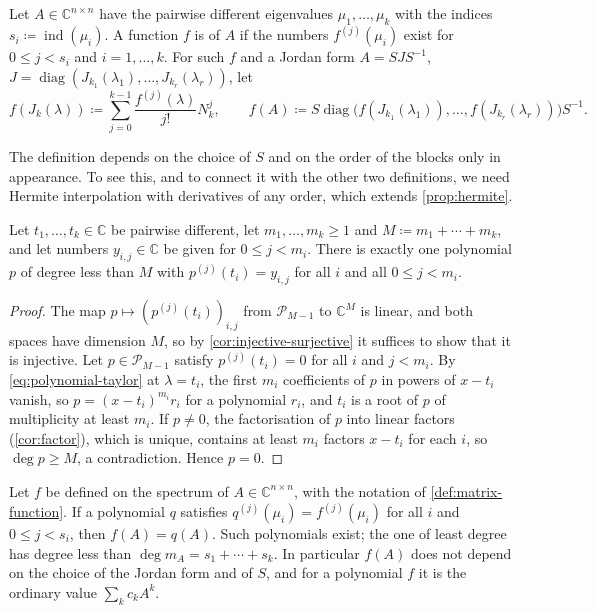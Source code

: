 \begin{definition}
\label{def:matrix-function}
Let $A\in\mathbb C^{n\times n}$ have the pairwise different eigenvalues $\mu_1,\ldots,\mu_k$ with the indices $s_i\coloneqq\operatorname{ind}(\mu_i)$. A function $f$ is  of $A$ if the numbers $f^{(j)}(\mu_i)$ exist for $0\le j<s_i$ and $i=1,\ldots,k$. For such $f$ and a Jordan form $A=SJS^{-1}$, $J=\operatorname{diag}(J_{k_1}(\lambda_1),\ldots,J_{k_r}(\lambda_r))$, let
\[
f(J_k(\lambda))\coloneqq\sum_{j=0}^{k-1}\frac{f^{(j)}(\lambda)}{j!}N_k^j,\qquad f(A)\coloneqq S\operatorname{diag}\bigl(f(J_{k_1}(\lambda_1)),\ldots,f(J_{k_r}(\lambda_r))\bigr)S^{-1}.
\]
\end{definition}

The definition depends on the choice of $S$ and on the order of the blocks only in appearance. To see this, and to connect it with the other two definitions, we need Hermite interpolation with derivatives of any order, which extends \cref{prop:hermite}.

\begin{proposition}
\label{prop:hermite-general}
Let $t_1,\ldots,t_k\in\mathbb C$ be pairwise different, let $m_1,\ldots,m_k\ge1$ and $M\coloneqq m_1+\cdots+m_k$, and let numbers $y_{i,j}\in\mathbb C$ be given for $0\le j<m_i$. There is exactly one polynomial $p$ of degree less than $M$ with $p^{(j)}(t_i)=y_{i,j}$ for all $i$ and all $0\le j<m_i$.
\end{proposition}

\begin{proof}
The map $p\mapsto(p^{(j)}(t_i))_{i,j}$ from $\mathcal P_{M-1}$ to $\mathbb C^M$ is linear, and both spaces have dimension $M$, so by \cref{cor:injective-surjective} it suffices to show that it is injective. Let $p\in\mathcal P_{M-1}$ satisfy $p^{(j)}(t_i)=0$ for all $i$ and $j<m_i$. By \eqref{eq:polynomial-taylor} at $\lambda=t_i$, the first $m_i$ coefficients of $p$ in powers of $x-t_i$ vanish, so $p=(x-t_i)^{m_i}r_i$ for a polynomial $r_i$, and $t_i$ is a root of $p$ of multiplicity at least $m_i$. If $p\ne0$, the factorisation of $p$ into linear factors (\cref{cor:factor}), which is unique, contains at least $m_i$ factors $x-t_i$ for each $i$, so $\deg p\ge M$, a contradiction. Hence $p=0$.
\end{proof}

\begin{theorem}
\label{thm:function-polynomial}
Let $f$ be defined on the spectrum of $A\in\mathbb C^{n\times n}$, with the notation of \cref{def:matrix-function}. If a polynomial $q$ satisfies $q^{(j)}(\mu_i)=f^{(j)}(\mu_i)$ for all $i$ and $0\le j<s_i$, then $f(A)=q(A)$. Such polynomials exist; the one of least degree has degree less than $\deg m_A=s_1+\cdots+s_k$. In particular $f(A)$ does not depend on the choice of the Jordan form and of $S$, and for a polynomial $f$ it is the ordinary value $\sum_kc_kA^k$.
\end{theorem}

